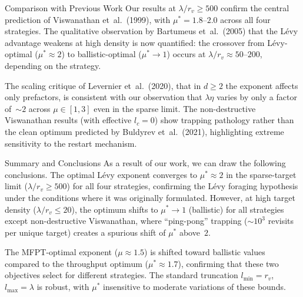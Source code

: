 \documentclass[aspectratio=169,xcolor=dvipsnames]{beamer}
\begin{document}
\begin{frame}{Comparison with Previous Work}
Our results at $\lambda/r_v \geq 500$ confirm the central prediction of Viswanathan et~al.\ (1999), with $\mu^* = 1.8$--$2.0$ across all four strategies. The qualitative observation by Bartumeus et~al.\ (2005) that the L\'evy advantage weakens at high density is now quantified: the crossover from L\'evy-optimal ($\mu^* \approx 2$) to ballistic-optimal ($\mu^* \to 1$) occurs at $\lambda/r_v \approx 50$--$200$, depending on the strategy.

\vspace{6pt}
The scaling critique of Levernier et~al.\ (2020), that in $d \geq 2$ the exponent affects only prefactors, is consistent with our observation that $\lambda\eta$ varies by only a factor of~${\sim}2$ across $\mu \in [1,3]$ even in the sparse limit. The non-destructive Viswanathan results (with effective $l_c = 0$) show trapping pathology rather than the clean optimum predicted by Buldyrev et~al.\ (2021), highlighting extreme sensitivity to the restart mechanism.
\end{frame}


\begin{frame}{Summary and Conclusions}
As a result of our work, we can draw the following conclusions. The optimal L\'evy exponent converges to $\mu^* \approx 2$ in the sparse-target limit ($\lambda/r_v \geq 500$) for all four strategies, confirming the L\'evy foraging hypothesis under the conditions where it was originally formulated. However, at high target density ($\lambda/r_v \leq 20$), the optimum shifts to $\mu^* \to 1$ (ballistic) for all strategies except non-destructive Viswanathan, where ``ping-pong'' trapping (${\sim}10^3$ revisits per unique target) creates a spurious shift of $\mu^*$ above~$2$.

\vspace{6pt}
The MFPT-optimal exponent ($\mu \approx 1.5$) is shifted toward ballistic values compared to the throughput optimum ($\mu^* \approx 1.7$), confirming that these two objectives select for different strategies. The standard truncation $l_{\min} = r_v$, $l_{\max} = \lambda$ is robust, with $\mu^*$ insensitive to moderate variations of these bounds.
\end{frame}
\end{document}

